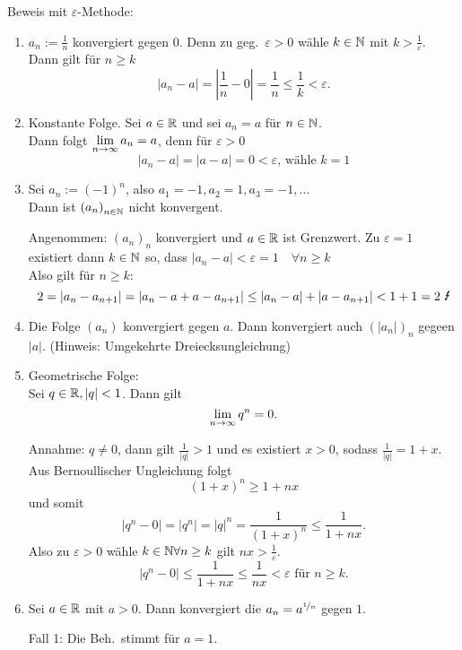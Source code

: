 \documentclass[../ana1.tex]{subfiles}
\begin{document}
\begin{bsp}
	Beweis mit \(\varepsilon \)-Methode:
	\begin{enumerate}
		\item \(a_n := \frac{1}{n}\) konvergiert gegen \(0\). Denn zu geg.\  \(\varepsilon > 0\) wähle \(k\in\mathbb{N} \) mit \(k>\frac{1}{\varepsilon}\). Dann gilt für \(n\geq k\)
		\[|a_n-a| = |\frac{1}{n} - 0| = \frac{1}{n} \leq \frac{1}{k} < \varepsilon.\]
		\item Konstante Folge. Sei \(a\in\mathbb{R} \) und sei \(a_n = a\) für \(n\in\mathbb{N} \).\\
		Dann folgt \(\lim\limits_{n\rightarrow\infty} a_n = a\), denn für \(\varepsilon > 0\)
		\[|a_n - a| = |a-a|=0<\varepsilon \text{, wähle } k=1\]
		\item Sei \(a_n := {(-1)}^n\), also \(a_1 = -1, a_2 = 1, a_3 = -1, \ldots \) \\
		Dann ist \({(a_n)}_{n\in\mathbb{N}}\) nicht konvergent.
		\begin{bew}
			Angenommen: \({(a_n)}_n\) konvergiert und \(a\in\mathbb{R} \) ist Grenzwert. Zu \(\varepsilon = 1\) existiert dann \(k\in\mathbb{N} \) so, dass \(|a_n - a| < \varepsilon = 1 \quad \forall n\geq k\) \\
			Also gilt für \(n\geq k\):
			\[2 = |a_n - a_{n+1}| = |a_n - a + a - a_{n+1}| \leq |a_n - a| + |a-a_{n+1}| < 1 + 1 = 2 \text{ \Lightning}\]
		\end{bew}
		\item Die Folge \((a_n)\) konvergiert gegen \(a\). Dann konvergiert auch \({(|a_n|)}_n\) gegeen \(|a|\). (Hinweis: Umgekehrte Dreiecksungleichung)
		\item Geometrische Folge:\\
		Sei \(q\in\mathbb{R}, |q|<1\). Dann gilt
		\[\lim\limits_{n\rightarrow\infty} q^n = 0.\]
		\begin{bew}
			Annahme: \(q\neq 0\), dann gilt \(\frac{1}{|q|}>1\) und es existiert \(x>0\), sodass \(\frac{1}{|q|} = 1 + x\).\\
			Aus Bernoullischer Ungleichung folgt 
			\[ {(1+x)}^n \geq 1+nx \]
			und somit 
			\[ |q^n-0| = |q^n| = |q|^n = \frac{1}{{(1+x)}^n} \leq \frac{1}{1+nx}. \]
			Also zu \(\varepsilon > 0\) wähle \(k\in\mathbb{N} \forall n\geq k\) gilt \(nx > \frac{1}{\varepsilon}\).
			\[|q^n-0|\leq \frac{1}{1+nx} \leq \frac{1}{nx} < \varepsilon \text{ für } n\geq k.\]
		\end{bew}
		\item Sei \(a\in\mathbb{R} \) mit \(a>0\). Dann konvergiert die \(a_n = a^{\nicefrac{1}{n}}\) gegen \(1\).
		\begin{bew}
			Fall 1: Die Beh.\ stimmt für \( a=1 \).\\

\end{bew}
\end{enumerate}
\end{bsp}
\end{document}
